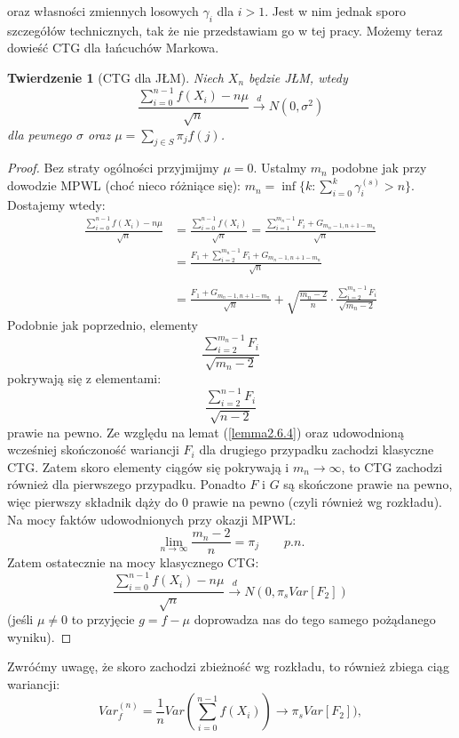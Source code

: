 \documentclass[a4paper]{article}
\theoremstyle{defn}
\theoremstyle{theorem}
\newtheorem{theorem}[defn]{Twierdzenie}
\theoremstyle{lemma}
\theoremstyle{cor}
\theoremstyle{fact}
\begin{document}
oraz własności zmiennych losowych $\gamma_i$ dla $i>1$. Jest w nim jednak sporo szczegółów technicznych, tak że nie przedstawiam go w tej pracy.
Możemy teraz dowieść CTG dla łańcuchów Markowa.\\
\begin{theorem}[CTG dla JŁM]\label{theorem2.6.5}
Niech $X_n$ będzie JŁM, wtedy
$$ \frac{\sum\limits_{i=0}^{n-1} f(X_i) - n\mu}{\sqrt{n}} \overset{d}{\to} N(0, \sigma^2)$$
dla pewnego $\sigma$ oraz $\mu = \sum\limits_{j \in S} \pi_j f(j)$.
\end{theorem}
\begin{proof}
Bez straty ogólności przyjmijmy $\mu = 0$. Ustalmy $m_n$ podobne jak przy dowodzie MPWL (choć nieco różniące się):
$m_n = \inf \{k: \sum\limits_{i=0}^k \gamma_i^{(s)} > n\}$. Dostajemy wtedy:
\begin{align*}
    \frac{\sum\limits_{i=0}^{n-1} f(X_i) - n\mu}{\sqrt{n}} &= \frac{\sum\limits_{i=0}^{n-1} f(X_i)}{\sqrt{n}} = \frac{\sum\limits_{i=1}^{m_n-1} F_i + G_{m_n-1, n+ 1 - m_n}}{\sqrt{n}}\\
    &= \frac{F_1 + \sum\limits_{i=2}^{m_n-1} F_i + G_{m_n-1, n+1 - m_n}}{\sqrt{n}}\\\\
    &= \frac{F_1 + G_{m_n-1, n + 1 - m_n}}{\sqrt{n}} + \sqrt{\frac{m_n -2}{n}} \cdot \frac{\sum\limits_{i=2}^{m_n-1} F_i }{\sqrt{m_n-2}}
\end{align*}
Podobnie jak poprzednio, elementy $$\frac{\sum\limits_{i=2}^{m_n-1} F_i }{\sqrt{m_n-2}}$$
pokrywają się z elementami: 
$$\frac{\sum\limits_{i=2}^{n-1} F_i }{\sqrt{n-2}}$$
prawie na pewno. Ze względu na lemat (\ref{lemma2.6.4}) oraz udowodnioną wcześniej skończoność wariancji $F_i$ dla drugiego przypadku zachodzi klasyczne CTG. Zatem skoro elementy ciągów się pokrywają i $m_n \to \infty$, to CTG zachodzi również dla pierwszego przypadku. Ponadto $F$ i $G$ są skończone prawie na pewno, więc pierwszy składnik dąży do 0 prawie na pewno (czyli również wg rozkładu). Na mocy faktów udowodnionych przy okazji MPWL: 
$$ \lim\limits_{n \to \infty} \frac{m_n -2}{n} = \pi_j \quad\quad p.n.$$
Zatem ostatecznie na mocy klasycznego CTG:
$$\frac{\sum\limits_{i=0}^{n-1} f(X_i) - n\mu}{\sqrt{n}} \overset{d}{\to} N(0, \pi_s Var[F_2])$$
(jeśli $\mu \neq 0$ to przyjęcie $g = f - \mu$ doprowadza nas do tego samego pożądanego wyniku). 
\end{proof}
Zwróćmy uwagę, że skoro zachodzi zbieżność wg rozkładu, to również zbiega ciąg wariancji:
$$Var_f^{(n)} = \frac{1}{n} Var\left(\sum\limits_{i=0}^{n-1} f(X_i)\right) \to \pi_s Var[F_2]),$$
\end{document}
